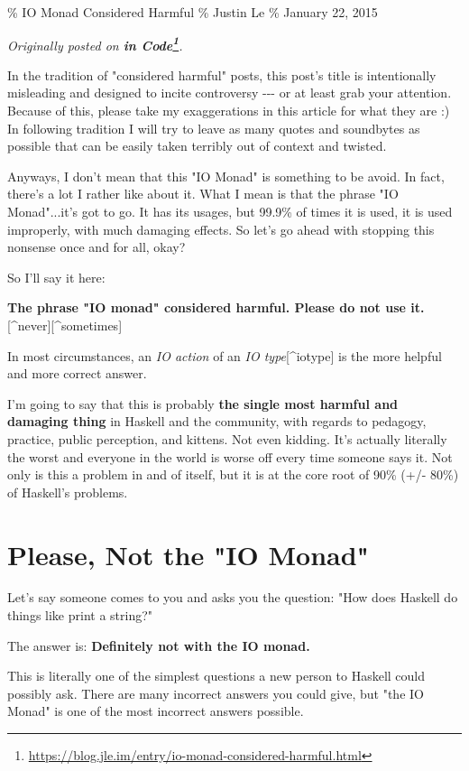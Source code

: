 \documentclass[]{article}
\renewcommand{\href}[2]{#2\footnote{\url{#1}}}
\begin{document}
\% IO Monad Considered Harmful \% Justin Le \% January 22, 2015

\emph{Originally posted on
\textbf{\href{https://blog.jle.im/entry/io-monad-considered-harmful.html}{in
Code}}.}

In the tradition of "considered harmful" posts, this post's title is
intentionally misleading and designed to incite controversy -\/-\/- or at least
grab your attention. Because of this, please take my exaggerations in this
article for what they are :) In following tradition I will try to leave as many
quotes and soundbytes as possible that can be easily taken terribly out of
context and twisted.

Anyways, I don't mean that this "IO Monad" is something to be avoid. In fact,
there's a lot I rather like about it. What I mean is that the phrase "IO
Monad"...it's got to go. It has its usages, but 99.9\% of times it is used, it
is used improperly, with much damaging effects. So let's go ahead with stopping
this nonsense once and for all, okay?

So I'll say it here:

\textbf{The phrase "IO monad" considered harmful. Please do not use
it.}{[}\^{}never{]}{[}\^{}sometimes{]}

In most circumstances, an \emph{IO action} of an \emph{IO type}{[}\^{}iotype{]}
is the more helpful and more correct answer.

I'm going to say that this is probably \textbf{the single most harmful and
damaging thing} in Haskell and the community, with regards to pedagogy,
practice, public perception, and kittens. Not even kidding. It's actually
literally the worst and everyone in the world is worse off every time someone
says it. Not only is this a problem in and of itself, but it is at the core root
of 90\% (+/- 80\%) of Haskell's problems.

\section{Please, Not the "IO Monad"}

Let's say someone comes to you and asks you the question: "How does Haskell do
things like print a string?"

The answer is: \textbf{Definitely not with the IO monad.}

This is literally one of the simplest questions a new person to Haskell could
possibly ask. There are many incorrect answers you could give, but "the IO
Monad" is one of the most incorrect answers possible.
\end{document}
